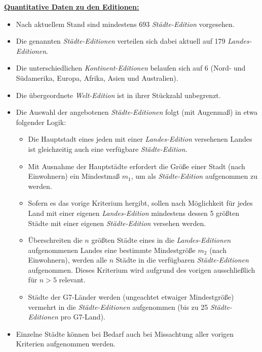 \vspace{0.4cm}

\underline{\textbf{Quantitative Daten zu den Editionen:}}

\begin{itemize}
    \item Nach aktuellem Stand sind mindestens 693 \textit{Städte-Edition} vorgesehen.
    \item Die genannten \textit{Städte-Editionen} verteilen sich dabei aktuell auf 179 \textit{Landes-Editionen}.
    \item Die unterschiedlichen \textit{Kontinent-Editionen} belaufen sich auf 6 (Nord- und Südamerika, Europa, Afrika, Asien und Australien).
    \item Die übergeordnete \textit{Welt-Edition} ist in ihrer Stückzahl unbegrenzt. 
    \item Die Auswahl der angebotenen \textit{Städte-Editionen} folgt (mit Augenmaß) in etwa folgender Logik:
    \begin{itemize}
    	\item Die Hauptstadt eines jeden mit einer \textit{Landes-Edition} versehenen Landes ist gleichzeitig auch eine verfügbare \textit{Städte-Edition}.
    	\item Mit Ausnahme der Hauptstädte erfordert die Größe einer Stadt (nach Einwohnern) ein Mindestmaß $m_1$, um als \textit{Städte-Edition} aufgenommen zu werden.
    	\item Sofern es das vorige Kriterium hergibt, sollen nach Möglichkeit für jedes Land mit einer eigenen \textit{Landes-Edition} mindestens dessen 5 größten Städte mit einer eigenen \textit{Städte-Edition} versehen werden.
    	\item Überschreiten die $n$ größten Städte eines in die \textit{Landes-Editionen} aufgenommenen Landes eine bestimmte Mindestgröße $m_2$ (nach Einwohnern), werden alle $n$ Städte in die verfügbaren \textit{Städte-Editionen} aufgenommen. Dieses Kriterium wird aufgrund des vorigen ausschließlich für $n > 5$ relevant.
    	\item Städte der G7-Länder werden (ungeachtet etwaiger Mindestgröße) vermehrt in die \textit{Städte-Editionen} aufgenommen (bis zu 25 \textit{Städte-Editionen} pro G7-Land).
    \end{itemize} 
    \item Einzelne Städte können bei Bedarf auch bei Missachtung aller vorigen Kriterien aufgenommen werden.
\end{itemize}

\vspace{0.5cm}




